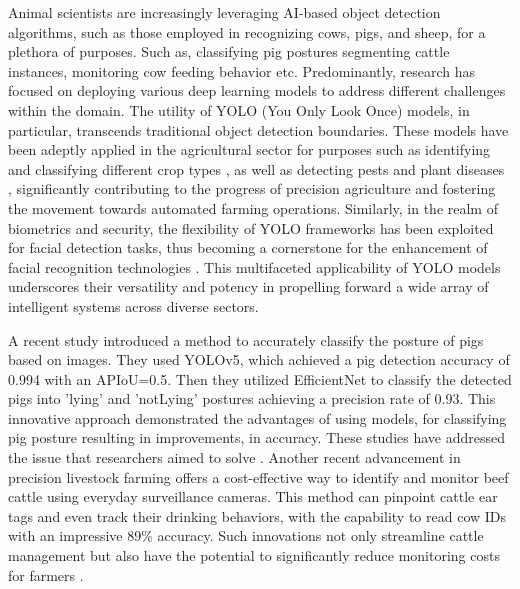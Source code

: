 Animal scientists are increasingly leveraging AI-based object detection algorithms, such as those employed in recognizing cows, pigs, and sheep, for a plethora of purposes. Such as, classifying pig postures segmenting cattle instances, monitoring cow feeding behavior etc. Predominantly, research has focused on deploying various deep learning models to address different challenges within the domain. The utility of YOLO (You Only Look Once) models, in particular, transcends traditional object detection boundaries. These models have been adeptly applied in the agricultural sector for purposes such as identifying and classifying different crop types \cite{tian2019apple,lippi2021yolo}, as well as detecting pests and plant diseases \cite{wu2020using}, significantly contributing to the progress of precision agriculture and fostering the movement towards automated farming operations. Similarly, in the realm of biometrics and security, the flexibility of YOLO frameworks has been exploited for facial detection tasks, thus becoming a cornerstone for the enhancement of facial recognition technologies \cite{yang2018real,chen2021yolo}. This multifaceted applicability of YOLO models underscores their versatility and potency in propelling forward a wide array of intelligent systems across diverse sectors.

A recent study introduced a method to accurately classify the posture of pigs based on images. They used YOLOv5, which achieved a pig detection accuracy of 0.994 with an APIoU=0.5. Then they utilized EfficientNet to classify the detected pigs into 'lying' and 'notLying' postures achieving a precision rate of 0.93. This innovative approach demonstrated the advantages of using models, for classifying pig posture resulting in improvements, in accuracy. These studies have addressed the issue that researchers aimed to solve \cite{witte2022introducing}. Another recent advancement in precision livestock farming offers a cost-effective way to identify and monitor beef cattle using everyday surveillance cameras. This method can pinpoint cattle ear tags and even track their drinking behaviors, with the capability to read cow IDs with an impressive 89\% accuracy. Such innovations not only streamline cattle management but also have the potential to significantly reduce monitoring costs for farmers \cite{prettonovel}.

